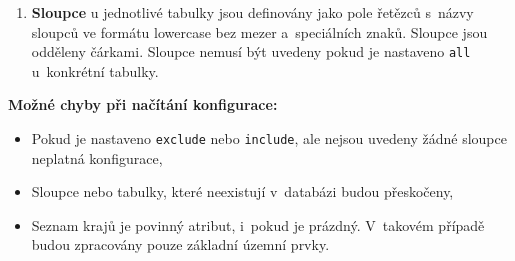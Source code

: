 \begin{enumerate}
    \item \textbf{Sloupce} u jednotlivé tabulky jsou definovány jako pole řetězců s~názvy sloupců 
    ve formátu lowercase bez mezer a~speciálních znaků. Sloupce jsou odděleny čárkami.
    Sloupce nemusí být uvedeny pokud je nastaveno \texttt{all} u~konkrétní tabulky.
\end{enumerate}

\textbf{Možné chyby při načítání konfigurace:}
\begin{itemize}
    \item Pokud je nastaveno \texttt{exclude} nebo \texttt{include}, ale nejsou uvedeny žádné sloupce \textrightarrow{} neplatná konfigurace,
    \item Sloupce nebo tabulky, které neexistují v~databázi \textrightarrow{} budou přeskočeny,
    \item Seznam krajů je povinný atribut, i~pokud je prázdný. V~takovém případě budou zpracovány pouze základní územní prvky.
\end{itemize}
